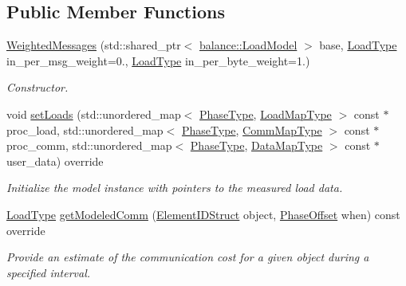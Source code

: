 \subsection*{Public Member Functions}
\begin{DoxyCompactItemize}
\item 
\hyperlink{structvt_1_1vrt_1_1collection_1_1balance_1_1_weighted_messages_a702340c1de974e4e616057a776b903d6}{Weighted\+Messages} (std\+::shared\+\_\+ptr$<$ \hyperlink{structvt_1_1vrt_1_1collection_1_1balance_1_1_load_model}{balance\+::\+Load\+Model} $>$ base, \hyperlink{namespacevt_a8fb51741340b87d7aaee0bef60e9896b}{Load\+Type} in\+\_\+per\+\_\+msg\+\_\+weight=0., \hyperlink{namespacevt_a8fb51741340b87d7aaee0bef60e9896b}{Load\+Type} in\+\_\+per\+\_\+byte\+\_\+weight=1.)
\begin{DoxyCompactList}\small\item\em Constructor. \end{DoxyCompactList}\item 
void \hyperlink{structvt_1_1vrt_1_1collection_1_1balance_1_1_weighted_messages_aced294a1e3e528a3c6b00051ed2258eb}{set\+Loads} (std\+::unordered\+\_\+map$<$ \hyperlink{namespacevt_a46ce6733d5cdbd735d561b7b4029f6d7}{Phase\+Type}, \hyperlink{namespacevt_1_1vrt_1_1collection_1_1balance_a5339303db2e1ce964d783a53fd74e6b1}{Load\+Map\+Type} $>$ const $\ast$proc\+\_\+load, std\+::unordered\+\_\+map$<$ \hyperlink{namespacevt_a46ce6733d5cdbd735d561b7b4029f6d7}{Phase\+Type}, \hyperlink{namespacevt_1_1vrt_1_1collection_1_1balance_a01ee1fb0ae2da1d2ab7fdca3be9ae351}{Comm\+Map\+Type} $>$ const $\ast$proc\+\_\+comm, std\+::unordered\+\_\+map$<$ \hyperlink{namespacevt_a46ce6733d5cdbd735d561b7b4029f6d7}{Phase\+Type}, \hyperlink{namespacevt_1_1vrt_1_1collection_1_1balance_acf152c668ed9e2e9c6b29784181d2435}{Data\+Map\+Type} $>$ const $\ast$user\+\_\+data) override
\begin{DoxyCompactList}\small\item\em Initialize the model instance with pointers to the measured load data. \end{DoxyCompactList}\item 
\hyperlink{namespacevt_a8fb51741340b87d7aaee0bef60e9896b}{Load\+Type} \hyperlink{structvt_1_1vrt_1_1collection_1_1balance_1_1_weighted_messages_a5f5d0c9259b71f373beda65ba5585b87}{get\+Modeled\+Comm} (\hyperlink{namespacevt_1_1vrt_1_1collection_1_1balance_a9f5b53fafb270212279a4757d2c4cd28}{Element\+I\+D\+Struct} object, \hyperlink{structvt_1_1vrt_1_1collection_1_1balance_1_1_phase_offset}{Phase\+Offset} when) const override
\begin{DoxyCompactList}\small\item\em Provide an estimate of the communication cost for a given object during a specified interval. \end{DoxyCompactList}\end{DoxyCompactItemize}
